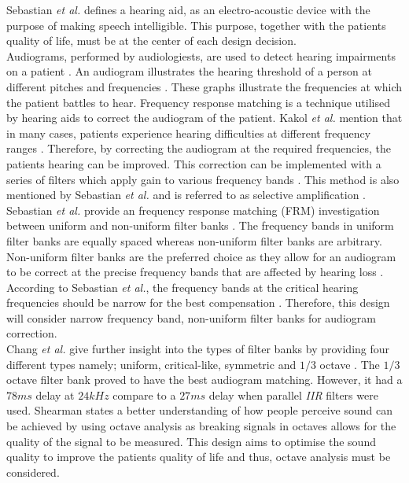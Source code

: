 \documentclass[12pt, onecolumn]{article}
\begin{document}
\noindent Sebastian \textit{et al.} \cite{sebastian} defines a hearing aid, as an electro-acoustic device with the purpose of making speech intelligible. This purpose, together with the patients quality of life, must be at the center of each design decision.\\
\newline
\noindent Audiograms, performed by audiologiests, are used to detect hearing impairments on a patient \cite{audiogram}. An audiogram illustrates the hearing threshold of a person at different pitches and frequencies \cite{sebastian}. These graphs illustrate the frequencies at which the patient battles to hear. Frequency response matching is a technique utilised by hearing aids to correct the audiogram of the patient. Kakol \textit{et al.} mention that in many cases, patients experience hearing difficulties at different frequency ranges \cite{diffMeth}. Therefore, by correcting the audiogram at the required frequencies, the patients hearing can be improved. This correction can be implemented with a series of filters which apply gain to various frequency bands \cite{diffMeth}. This method is also mentioned by Sebastian \textit{et al.} and is referred to as selective amplification \cite{sebastian}.\\
\newline
\noindent Sebastian \textit{et al.} provide an frequency response matching (FRM) investigation between uniform and non-uniform filter banks \cite{sebastian}. The frequency bands in uniform filter banks are equally spaced whereas non-uniform filter banks are arbitrary. Non-uniform filter banks are the preferred choice as they allow for an audiogram to be correct at the precise frequency bands that are affected by hearing loss \cite{sebastian}. According to Sebastian \textit{et al.}, the frequency bands at the critical hearing frequencies should be narrow for the best compensation \cite{sebastian}. Therefore, this design will consider narrow frequency band, non-uniform filter banks for audiogram correction. \\
\newline
\noindent Chang \textit{et al.} give further insight into the types of filter banks by providing four different types namely; uniform, critical-like, symmetric and $1/3$ octave \cite{chang}. The $1/3$ octave filter bank proved to have the best audiogram matching. However, it had a $78ms$ delay at $24kHz$ compare to a $27ms$ delay when parallel \textit{IIR} filters were used. Shearman \cite{octave} states a better understanding of how people perceive sound can be achieved by using octave analysis as breaking signals in octaves allows for the quality of the signal to be measured. This design aims to optimise the sound quality to improve the patients quality of life and thus, octave analysis must be considered.\\
\end{document}
